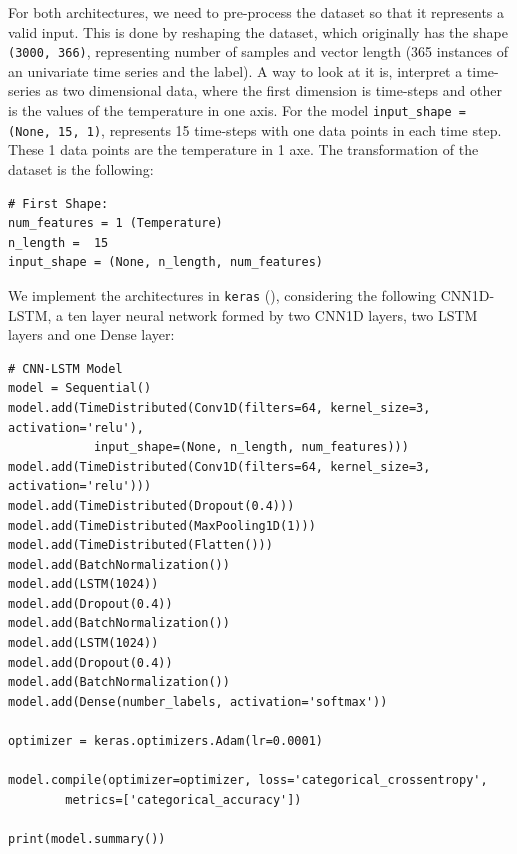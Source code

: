 For both architectures, we need to pre-process the dataset so that it represents a valid input. This is done by reshaping the dataset, which originally has the shape \texttt{(3000, 366)}, representing number of samples and vector length (365 instances of an univariate time series and the label). A way to look at it is, interpret a time-series as two dimensional data, where the first dimension is time-steps and other is the values of the  temperature in one axis. For the model \texttt{input\_shape = (None, 15, 1)}, represents 15 time-steps with one data points in each time step. These 1 data points are the temperature in 1 axe. The transformation of the dataset is the following:

\lstset{language=Python}
\lstset{frame=lines}
\lstset{basicstyle=\footnotesize}
\begin{lstlisting}
# First Shape:
num_features = 1 (Temperature)
n_length =  15
input_shape = (None, n_length, num_features)
\end{lstlisting}

We implement the architectures in \texttt{keras} (\cite{Chollet2015}),  considering the following CNN1D-LSTM, a ten layer neural network formed by two CNN1D layers, two LSTM layers and one Dense layer:

\lstset{language=Python}
\lstset{frame=lines}
\lstset{basicstyle=\footnotesize}
\begin{lstlisting}
# CNN-LSTM Model
model = Sequential()
model.add(TimeDistributed(Conv1D(filters=64, kernel_size=3, activation='relu'), 
			input_shape=(None, n_length, num_features)))
model.add(TimeDistributed(Conv1D(filters=64, kernel_size=3, activation='relu')))
model.add(TimeDistributed(Dropout(0.4)))
model.add(TimeDistributed(MaxPooling1D(1)))
model.add(TimeDistributed(Flatten()))
model.add(BatchNormalization())
model.add(LSTM(1024))
model.add(Dropout(0.4))
model.add(BatchNormalization())
model.add(LSTM(1024))
model.add(Dropout(0.4))
model.add(BatchNormalization())
model.add(Dense(number_labels, activation='softmax'))

optimizer = keras.optimizers.Adam(lr=0.0001)

model.compile(optimizer=optimizer, loss='categorical_crossentropy', 
		metrics=['categorical_accuracy'])

print(model.summary())
\end{lstlisting}

